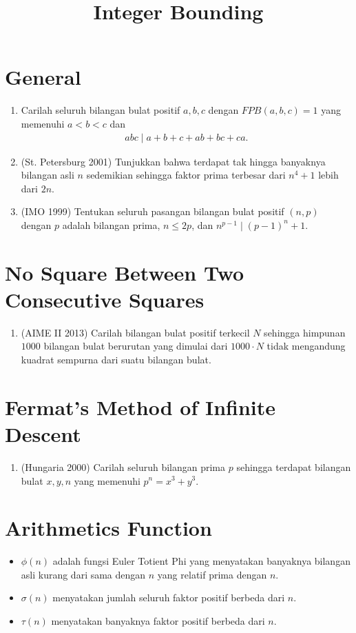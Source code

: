 \documentclass[12pt]{scrartcl}
\title{Integer Bounding}
\begin{document}
\renewcommand*\contentsname{Daftar Isi}
\tableofcontents

\newpage

\section{General}
\begin{enumerate}
    \item Carilah seluruh bilangan bulat positif $a,b,c$ dengan $FPB(a,b,c)=1$ yang memenuhi $a<b<c$ dan
    \begin{align*}
        abc \mid a+b+c+ab+bc+ca.
    \end{align*}

    \item (St. Petersburg 2001) Tunjukkan bahwa terdapat tak hingga banyaknya bilangan asli $n$ sedemikian sehingga faktor prima terbesar dari $n^4+1$ lebih dari $2n$.

    \item (IMO 1999) Tentukan seluruh pasangan bilangan bulat positif $(n,p)$ dengan $p$ adalah bilangan prima, $n \le 2p$, dan $n^{p-1} \mid (p-1)^n+1$.
\end{enumerate}

\section{No Square Between Two Consecutive Squares}
\begin{enumerate}[resume]
    \item (AIME II 2013) Carilah bilangan bulat positif terkecil $N$ sehingga himpunan $1000$ bilangan bulat berurutan yang dimulai dari $1000\cdot N$ tidak mengandung kuadrat sempurna dari suatu bilangan bulat.
\end{enumerate}

\section{Fermat's Method of Infinite Descent}
\begin{enumerate}[resume]
    \item (Hungaria 2000) Carilah seluruh bilangan prima $p$ sehingga terdapat bilangan bulat $x,y,n$ yang memenuhi $p^n=x^3+y^3$.
\end{enumerate}

\section{Arithmetics Function}
\begin{itemize}
    \item $\phi(n)$ adalah fungsi Euler Totient Phi yang menyatakan banyaknya bilangan asli kurang dari sama dengan $n$ yang relatif prima dengan $n$.
    \item $\sigma(n)$ menyatakan jumlah seluruh faktor positif berbeda dari $n$.
    \item $\tau(n)$ menyatakan banyaknya faktor positif berbeda dari $n$.
\end{itemize}
\end{document}
